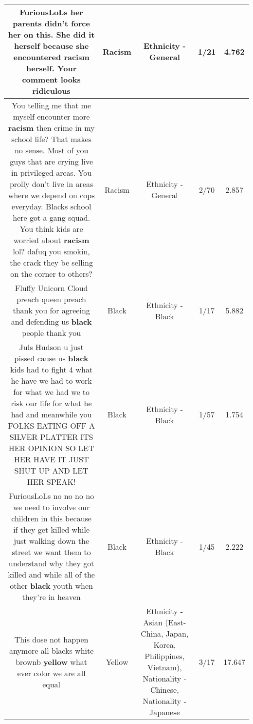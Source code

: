 \documentclass[11pt]{article}
\newlength\mylength
\begin{document}
\begin{center}
\begin{longtable}{|C{.65\mylength}|C{.30\mylength}|C{.12\mylength}|C{.12\mylength}|C{.12\mylength}|}
  \small FuriousLoLs her parents didn't force her on this. She did it herself because she encountered \textbf{racism} herself. Your comment looks ridiculous\normalsize   & Racism & Ethnicity - General & 1/21 & 4.762 \\  \hline
  \small You telling me that me myself encounter more \textbf{racism} then crime in my school life? That makes no sense. Most of you guys that are crying live in privileged areas. You prolly don't live in areas where we depend on cops everyday. Blacks school here got a gang squad. You think kids are worried about \textbf{racism} lol? dafuq you smokin, the crack they be selling on the corner to others?\normalsize   & Racism & Ethnicity - General & 2/70 & 2.857 \\  \hline
  \small Fluffy Unicorn Cloud preach queen preach thank you for agreeing and defending us \textbf{black} people thank you\normalsize   & Black & Ethnicity - Black & 1/17 & 5.882 \\  \hline
  \small Juls Hudson u just pissed cause us \textbf{black} kids had to fight 4 what he have we had to work for what we had we to risk our life for what he had and meanwhile you FOLKS EATING OFF A SILVER PLATTER ITS HER OPINION SO LET HER HAVE IT JUST SHUT UP AND LET HER SPEAK!\normalsize   & Black & Ethnicity - Black & 1/57 & 1.754 \\  \hline
  \small FuriousLoLs no no no no we need to involve our children in this because if they get killed while just walking down the street we want them to understand why they got killed and while all of the other \textbf{black} youth when they're in heaven\normalsize   & Black & Ethnicity - Black & 1/45 & 2.222 \\  \hline
  \small This dose not happen anymore all blacks white brownb \textbf{y\textbf{e\textbf{llow}}} what ever color we are all equal\normalsize   & Yellow & Ethnicity - Asian (East- China, Japan, Korea, Philippines, Vietnam), Nationality - Chinese, Nationality - Japanese & 3/17 & 17.647 \\  \hline

\end{longtable}
\end{center}
\end{document}
